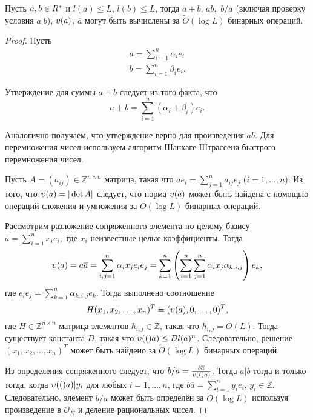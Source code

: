 \documentclass[_00_dissertation.tex]{subfiles}
\begin{document}
\begin{proposition}\label{proposition:operations}
    Пусть $a, b \in R^{*}$ и $l(a) \leq L$, $l(b) \leq L$, тогда $a + b$, $a b,$ $b/a$ (включая проверку условия $a|b$), $\upsilon(a)$, $\overline{a}$ могут быть  вычислены за $\tilde{O}(\log L)$ бинарных операций.
\end{proposition}
\begin{proof}
    Пусть
    \begin{equation*}
        \begin{split}
            a = \sum_{i = 1}^n \alpha_i e_i\\
            b = \sum_{i = 1}^n \beta_i e_i.
        \end{split}
    \end{equation*}

    Утверждение для суммы $a + b$ следует из того факта, что
    \begin{equation*}
        a + b = \sum_{i = 1}^n (\alpha_i + \beta_i) e_i.
    \end{equation*}

    Аналогично получаем, что утверждение верно для произведения $ab$.
    Для перемножения чисел используем алгоритм Шанхаге-Штрассена быстрого перемножения чисел.

    Пусть $A = (a_{ij}) \in \mathbb{Z}^{n \times n}$ матрица, такая что $a e_i = \sum_{j = 1}^n a_{ij}e_j$ ($i=1,\ldots,n$).
    Из того, что $\upsilon(a) = |\det{A}|$ следует, что норма $\upsilon(a)$ может быть найдена с помощью операций сложения и умножения за $\tilde{O}(\log L)$ бинарных операций.

    Рассмотрим разложение сопряженного элемента по целому базису $\overline{a} = \sum_{i = 1}^n x_i e_i,$ где $x_i$ неизвестные целые коэффициенты.
    Тогда
    \begin{equation*}
        \upsilon(a) = a \overline{a} = \sum_{i, j = 1}^n  \alpha_i x_j e_i e_j =
            \sum_{k = 1}^n \left(
                \sum_{i = 1}^n \sum_{j = 1}^n \alpha_i x_j \alpha_{k, i, j}
            \right) e_k,
    \end{equation*}
    где $e_i e_j = \sum_{k=1}^n \alpha_{k, i, j} e_k$.
    Тогда выполнено соотношение
    \begin{equation*}
        H(x_1, x_2, \ldots, x_n)^T = (\upsilon(a), 0, \ldots, 0)^T,
    \end{equation*}
    где $H \in \mathbb{Z}^{n \times n}$ матрица элементов $h_{i, j} \in \mathbb{Z}$, такая что $h_{i, j} = O(L)$.
    Тогда существует константа $D$, такая что $\upsilon(()a) \le D l(a)^n$.
    Следовательно, решение $(x_1, x_2, \ldots, x_n)^T$ может быть найдено за $\tilde{O}(\log L)$ бинарных операций.

    Из определения сопряженного следует, что $b/a = \frac{b\overline{a}}{\upsilon(()a)}$.
    Тогда $a|b$ тогда и только тогда, когда $\upsilon(()a)|y_i$ для любых $i = 1, \ldots, n$, где $b\overline{a} = \sum_{i=1}^n y_i e_i$, $y_i \in \mathbb{Z}$.
    Следовательно, элемент $b/a$ может быть определён за $\tilde{O}(\log L)$ используя произведение в $\mathcal{O}_K$ и деление рациональных чисел. 
\end{proof}
\end{document}
